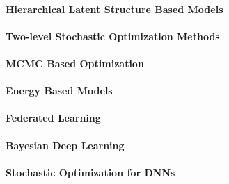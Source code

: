 \documentclass[twoside,11pt]{article}
\begin{document}
\clearpage

\textbf{\scalebox{1.3}{(b) Latent Sampling and Optimization}}

\vspace{0.03in}
\lipsum[35]

\vspace{0.08in}
\paragraph{Hierarchical Latent Structure Based Models} \lipsum[35]

\vspace{0.08in}
\paragraph{Two-level Stochastic Optimization Methods} \lipsum[35]

\vspace{0.08in}
\paragraph{MCMC Based Optimization} \lipsum[35]



\newpage

\textbf{\scalebox{1.3}{Future Research Directions}} 

\vspace{0.03in}
\lipsum[35]

\vspace{0.08in}
\paragraph{Energy Based Models} \lipsum[35]

\vspace{0.08in}
\paragraph{Federated Learning} \lipsum[35]

\vspace{0.08in}
\paragraph{Bayesian Deep Learning} \lipsum[35]

\vspace{0.08in}
\paragraph{Stochastic Optimization for DNNs} \lipsum[35]




\newpage

\textbf{\scalebox{1.3}{References}}
\vspace{-0.3in}
\nocite{*}

\end{document}
